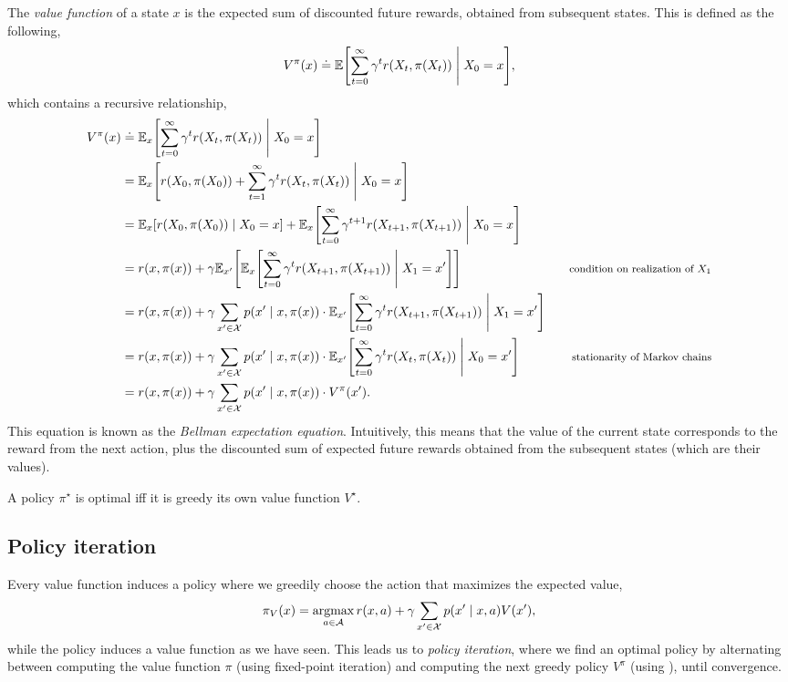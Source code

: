 The \textit{value function} of a state $x$ is the expected sum of discounted
future rewards, obtained from subsequent states. This is defined as the
following, \[
  V^\pi(x) \doteq \E \lft[ \sum_{t=0}^\infty \gamma^t r(X_t,\pi(X_t)) \;\middle|\; X_0=x \rgt]
,\]
which contains a recursive relationship,
\begin{align*}
  V^\pi(x) &\doteq \E_x \lft[ \sum_{t=0}^\infty \gamma^t r(X_t, \pi(X_t)) \;\middle|\; X_0=x \rgt] \\
  &= \E_x \lft[ r(X_0, \pi(X_0)) + \sum_{t=1}^\infty \gamma^t r(X_t, \pi(X_t)) \;\middle|\; X_0=x \rgt] \\
  &= \E_x \lft[ r(X_0, \pi(X_0)) \;\middle|\; X_0=x \rgt] + \E_x \lft[ \sum_{t=0}^\infty \gamma^{t+1} r(X_{t+1}, \pi(X_{t+1})) \;\middle|\; X_0=x \rgt] \\
  &= r(x, \pi(x)) + \gamma \E_{x'} \lft[ \E_x \lft[ \sum_{t=0}^\infty \gamma^t r(X_{t+1}, \pi(X_{t+1})) \;\middle|\; X_1=x' \rgt] \rgt] & \text{\footnotesize condition on realization of $X_1$} \\
  &= r(x, \pi(x)) + \gamma \sum_{x'\in\mathcal{X}} p(x'\mid x,\pi(x)) \cdot \E_{x'} \lft[ \sum_{t=0}^\infty \gamma^t r(X_{t+1}, \pi(X_{t+1})) \;\middle|\; X_1=x' \rgt] \\
  &= r(x, \pi(x)) + \gamma \sum_{x'\in\mathcal{X}} p(x'\mid x,\pi(x)) \cdot \E_{x'} \lft[ \sum_{t=0}^\infty \gamma^t r(X_t, \pi(X_t)) \;\middle|\; X_0=x' \rgt] & \text{\footnotesize stationarity of Markov chains} \\
  &= r(x, \pi(x)) + \gamma \sum_{x'\in\mathcal{X}} p(x'\mid x,\pi(x)) \cdot V^\pi(x')
.\end{align*}
This equation is known as the \textit{Bellman expectation equation}.
Intuitively, this means that the value of the current state corresponds to the
reward from the next action, plus the discounted sum of expected future rewards
obtained from the subsequent states (which are their values).

\begin{theorem} \label{thm:bellman}
  A policy $\pi^\star$ is optimal iff it is greedy \wrt its own value function
  $V^\star$.
\end{theorem}

\subsection{Policy iteration}

Every value function induces a policy where we greedily choose the action that
maximizes the expected value,
\begin{equation}
  \pi_V(x) = \argmax_{a\in\mathcal{A}} r(x,a) + \gamma \sum_{x'\in\mathcal{X}} p(x'\mid x,a) V(x')
  \label{eq:greedy-policy}
,\end{equation}
while the policy induces a value function as we have seen. This leads us to
\textit{policy iteration}, where we find an optimal policy by alternating
between computing the value function \wrt $\pi$ (using fixed-point iteration)
and computing the next greedy policy \wrt $V^\pi$ (using
), until convergence.

